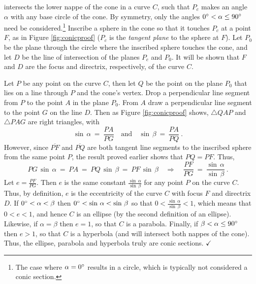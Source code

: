intersects the lower nappe of the cone in a curve $C$, such that $P_c$ makes an
angle $\alpha$ with any base circle of the cone. By symmetry, only the angles
$0^\circ < \alpha \le 90^\circ$ need be considered.\footnote{The case
where $\alpha = 0^\circ$ results in a circle, which is typically not
considered a conic section.}
Inscribe a sphere in the cone so that it touches $P_c$ at a point $F$, as in
Figure \ref{fig:conicproof} ($P_c$ is the \emph{tangent plane} to the sphere at
$F$). Let $P_0$ be the plane through the circle where the inscribed sphere
touches the cone, and let $D$ be the line of intersection of the planes $P_c$
and $P_0$. It will be shown that $F$ and $D$ are the focus and directrix,
respectively, of the curve $C$.

Let $P$ be any point on the curve $C$, then let
$Q$ be the point on the plane $P_0$ that lies on a line through $P$ and the
cone's vertex. Drop a perpendicular line segment from $P$ to the point $A$ in
the plane $P_0$. From $A$ draw a perpendicular line segment to the point $G$ on
the line $D$. Then as Figure \ref{fig:conicproof} shows, $\triangle QAP$ and
$\triangle PAG$ are right triangles, with
\[
\sin\,\alpha ~=~ \frac{PA}{PG} \quad\text{and}\quad
\sin\,\beta ~=~ \frac{PA}{PQ} ~.
\]
However, since $\overline{PF}$ and $\overline{PQ}$ are both tangent line
segments to the inscribed sphere from the same point $P$, the result proved
earlier shows that $PQ = PF$. Thus,
\[
PG\,\sin\,\alpha ~=~ PA ~=~ PQ\,\sin\,\beta ~=~ PF\,\sin\,\beta
\quad\Rightarrow\quad \frac{PF}{PG} ~=~ \frac{\sin\,\alpha}{\sin\,\beta} ~.
\]
Let $e = \frac{PF}{PG}$. Then $e$ is the same constant
$\frac{\sin\,\alpha}{\sin\,\beta}$ for any point $P$ on the curve $C$. Thus, by
definition, $e$ is the eccentricity of the curve $C$ with focus $F$ and
directrix $D$. If $0^\circ < \alpha < \beta$ then $0^\circ <
\sin\,\alpha < \sin\,\beta$ so that $0 < \frac{\sin\,\alpha}{\sin\,\beta} < 1$,
which means that $0 < e < 1$, and hence $C$ is an ellipse (by the second
definition of an ellipse). Likewise, if $\alpha = \beta$ then $e=1$, so that $C$
is a parabola. Finally, if $\beta < \alpha \le 90^\circ$ then $e > 1$, so that
$C$ is a hyperbola (and will intersect both nappes of the cone). Thus, the
ellipse, parabola and hyperbola truly are conic sections. $\checkmark$
\newpage
\startexercises\label{sec7dot3}
